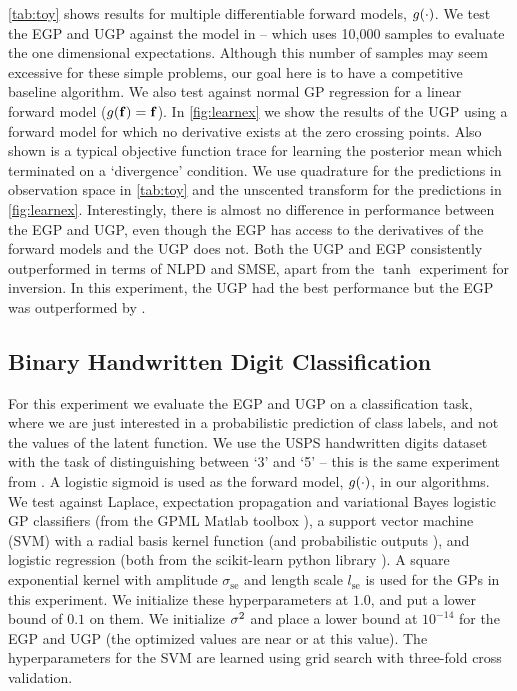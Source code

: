 \documentclass{article} %
\begin{document}
\autoref{tab:toy} shows results for multiple differentiable forward models,
$g\!\left({{\cdot}}\right)$. We test the EGP and UGP against the model in \cite{Opper2009}
-- which uses 10,000 samples to evaluate the one dimensional expectations. 
Although this number of samples may seem excessive for these simple problems, our goal
here is to have a competitive baseline algorithm. 
We also test against normal GP
regression for a linear forward model ($g\!\left({{\mathbf{f}}}\right) = \mathbf{f}$). In
\autoref{fig:learnex} we show the results of the UGP using a forward model for
which no derivative exists at the zero crossing points. Also shown is a typical
objective function trace for learning the posterior mean which terminated on a
`divergence' condition. We use quadrature for the predictions in observation
space in \autoref{tab:toy} and the unscented transform for the predictions in
\autoref{fig:learnex}. Interestingly, there is almost no difference in
performance between the EGP and UGP, even though the EGP has access to the
derivatives of the forward models and the UGP does not. 
Both the UGP and EGP
consistently outperformed \cite{Opper2009} in terms of  NLPD and  SMSE, 
apart from the $\tanh$ experiment for inversion. In this experiment, 
the UGP had the best performance but the EGP was outperformed by  \cite{Opper2009}.



\subsection{Binary Handwritten Digit Classification}

For this experiment we evaluate the EGP and UGP on a %
classification task, where we are just interested in a probabilistic prediction
of class labels, and not the values of the latent function. We use 
the USPS handwritten digits dataset with the task of distinguishing between
`3' and `5' -- this is the same experiment from \cite{Rasmussen2006}. A
logistic sigmoid is used as the forward model, $g\!\left({{\cdot}}\right)$, in our
algorithms. We test against Laplace, expectation propagation and variational
Bayes logistic GP classifiers (from the GPML Matlab toolbox
\cite{Rasmussen2006}), a support vector machine (SVM) with a radial basis
kernel function (and probabilistic outputs \cite{Platt1999}), and logistic
regression (both from the scikit-learn python library \cite{scikit-learn}). A
square exponential kernel with amplitude $\sigma_\text{se}$ and length scale
$l_\text{se}$ is used for the GPs in this experiment. We initialize these
hyperparameters at $1.0$, and put a lower bound of $0.1$ on them. We initialize
$\sigma^2$ and place a lower bound at $10^{-14}$ for the EGP and UGP (the
optimized values are near or at this value). The hyperparameters for the SVM
are learned using grid search with three-fold cross validation. 
\end{document}
